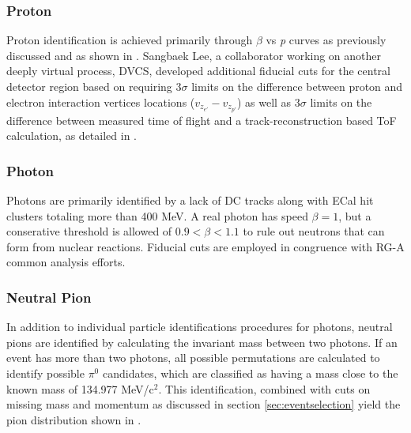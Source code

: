     

    
    \subsubsection*{Proton}
        Proton identification is achieved primarily through $\beta$ vs \textit{p} curves as previously discussed and as shown in . Sangbaek Lee, a collaborator working on another deeply virtual process, DVCS, developed additional fiducial cuts for the central detector region based on requiring 3$\sigma$ limits on the difference between proton and electron interaction vertices locations ($v_{z_{e'}} - v_{z_{p'}}$) as well as 3$\sigma$ limits on the difference between measured time of flight and a track-reconstruction based ToF calculation, as detailed in \parencite{Lee2022MeasurementDetector}.

    
    \subsubsection*{Photon}
        Photons are primarily identified by a lack of DC tracks along with ECal hit clusters totaling more than 400 MeV. A real photon has speed $\beta=1$, but a conserative threshold is allowed of $0.9<\beta<1.1$ to rule out neutrons that can form from nuclear reactions. Fiducial cuts are employed in congruence with RG-A common analysis efforts. 
    
        
    \subsubsection*{Neutral Pion}
        In addition to individual particle identifications procedures for photons, neutral pions are identified by calculating the invariant mass between two photons. If an event has more than two photons, all possible permutations are calculated to identify possible $\pi^0$ candidates, which are classified as having a mass close to the known mass of 134.977 MeV/c$^2$. This identification, combined with cuts on missing mass and momentum as discussed in section \ref{sec:eventselection} yield the pion distribution shown in . 
        
